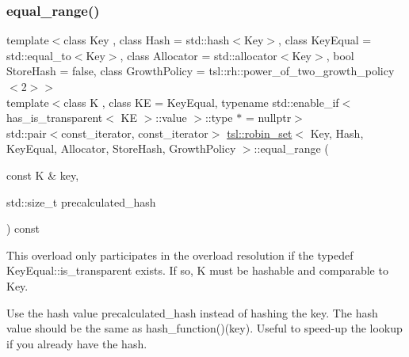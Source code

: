 \subsubsection{\texorpdfstring{equal\_range()}{equal\_range()}\hspace{0.1cm}{\footnotesize\ttfamily [6/6]}}
{\footnotesize\ttfamily template$<$class Key , class Hash  = std\+::hash$<$\+Key$>$, class Key\+Equal  = std\+::equal\+\_\+to$<$\+Key$>$, class Allocator  = std\+::allocator$<$\+Key$>$, bool Store\+Hash = false, class Growth\+Policy  = tsl\+::rh\+::power\+\_\+of\+\_\+two\+\_\+growth\+\_\+policy$<$2$>$$>$ \\
template$<$class K , class KE  = Key\+Equal, typename std\+::enable\+\_\+if$<$ has\+\_\+is\+\_\+transparent$<$ K\+E $>$\+::value $>$\+::type $\ast$  = nullptr$>$ \\
std\+::pair$<$const\+\_\+iterator, const\+\_\+iterator$>$ \mbox{\hyperlink{classtsl_1_1robin__set}{tsl\+::robin\+\_\+set}}$<$ Key, Hash, Key\+Equal, Allocator, Store\+Hash, Growth\+Policy $>$\+::equal\+\_\+range (\begin{DoxyParamCaption}\item[{const K \&}]{key,  }\item[{std\+::size\+\_\+t}]{precalculated\+\_\+hash }\end{DoxyParamCaption}) const\hspace{0.3cm}{\ttfamily [inline]}}





This overload only participates in the overload resolution if the typedef Key\+Equal\+::is\+\_\+transparent exists. If so, K must be hashable and comparable to Key.

Use the hash value \textquotesingle{}precalculated\+\_\+hash\textquotesingle{} instead of hashing the key. The hash value should be the same as hash\+\_\+function()(key). Useful to speed-\/up the lookup if you already have the hash. \mbox{\label{classtsl_1_1robin__set_a4d81adc873ab3959505e93a462b541c9}} 
